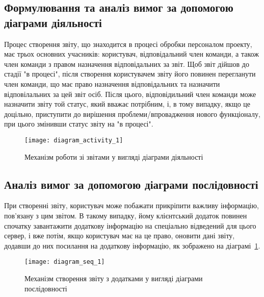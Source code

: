 \documentclass[../main.tex]{subfiles}
\begin{document}
\subsection{Формулювання та аналіз вимог за допомогою діаграми діяльності}

Процес створення звіту, що знаходится в процесі обробки персоналом проекту, має трьох основних учасників: користувач, відповідальний член команди, а також член команди з правом назначення відповідальних за звіт. Щоб звіт дійшов до стадії "в процесі"\mbox{}, після створення користувачем звіту його повинен перегланути член команди, що має право назначення відповідальних та назначити відповілальних за цей звіт осіб. Після цього, відповідильний член команди може назначити звіту той статус, який вважає потрібним, і, в тому випадку, якщо це доцільно, приступити до вирішення проблеми/впровадження нового функціоналу, при цього змінивши статус звіту на "в процесі".


\begin{figure}[H]
\centering
\texttt{[image: diagram\_activity\_1]}
\caption{Механізм роботи зі звітами у вигляді діаграми діяльності}
\end{figure}

\subsection{Аналіз вимог за допомогою діаграми послідовності}

При створенні звіту, користувач може побажати прикріпити важливу інформацію, пов'язану з цим звітом. В такому випадку, йому клієнтський додаток повинен спочатку завантажити додаткову інформацію на спеціально відведений для цього сервер, і вже потім, якщо користувач має на це право, оновити дані звіту, додавши до них посилання на додаткову інформацію, як зображено на діаграмі~\ref{figure_diag_seq_1}.

\begin{figure}[H]
	\centering
	\texttt{[image: diagram\_seq\_1]}
	\caption{Механізм створення звіту з додатками у вигляді діаграми послідовності}
	\label{figure_diag_seq_1}
\end{figure}
\end{document}
